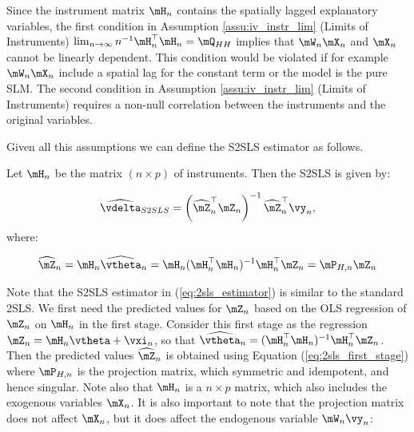 \documentclass[english,12pt]{book}\usepackage[]{graphicx}\usepackage[]{xcolor}
\begin{document}
Since the instrument matrix $\mH_n$ contains the spatially lagged explanatory variables, the first condition in Assumption \ref{assu:iv_instr_lim} (Limits of Instruments) $\lim_{n\to \infty} n^{-1}\mH_n^\top\mH_n = \mQ_{HH}$ implies that $\mW_n\mX_n$ and $\mX_n$ cannot be linearly dependent. This condition would be violated if for example $\mW_n\mX_n$ include a spatial lag for the constant term or the model is the pure SLM.  The second condition in Assumption \ref{assu:iv_instr_lim} (Limits of Instruments) requires a non-null correlation between the instruments and the original variables.


Given all this assumptions we can define the S2SLS estimator as follows.

\begin{definition}
Let $\mH_n$ be the matrix $(n\times p)$ of instruments. Then the S2SLS is given by:

\begin{equation}\label{eq:2sls_estimator}
  \widehat{\vdelta}_{S2SLS} =  \left(\widehat{\mZ}_n^\top\mZ_n\right)^{-1}\widehat{\mZ}^\top_n\vy_n,
\end{equation}
%
where:

\begin{equation}\label{eq:2sls_first_stage}
\widehat{\mZ}_n = \mH_n \widehat{\vtheta}_n = \mH_n(\mH^\top_n\mH_n)^{-1}\mH^\top_n\mZ_n = \mP_{H, n}\mZ_n
\end{equation}
\end{definition}

Note that the S2SLS estimator in (\ref{eq:2sls_estimator}) is similar to the standard 2SLS. We first need the predicted values for $\mZ_n$ based on the OLS regression of $\mZ_n$ on $\mH_n$ in the first stage. Consider this first stage as the regression $\mZ_n = \mH_n\vtheta + \vxi_n$, so that $\widehat{\vtheta}_n = (\mH^\top_n\mH_n)^{-1}\mH^\top_n\mZ_n$. Then the predicted values $\widehat{\mZ}_n$ is obtained using Equation (\ref{eq:2sls_first_stage}) where $\mP_{H,n}$ is the projection matrix, which symmetric and idempotent, and hence singular. Note also that $\mH_n$ is a $n\times p$ matrix, which also includes the exogenous variables $\mX_n$. It is also important to note that the projection matrix does not affect $\mX_n$, but it does affect the endogenous variable $\mW_n\vy_n$:
\end{document}
